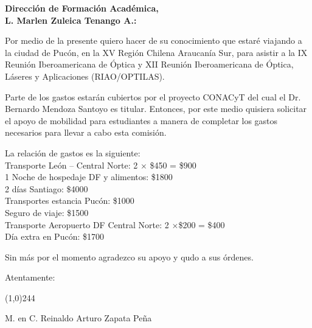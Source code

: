 \documentclass[11pt]{article}
\begin{document}
\thispagestyle{empty}

\noindent
\textbf{\large Direcci\'on de Formaci\'on Acad\'emica, \\
L. Marlen Zuleica Tenango A.:}

\vspace{2cm}

Por medio de la presente quiero hacer de su conocimiento que estar\'e viajando
a la ciudad de Puc\'on, en la XV Regi\'on Chilena Araucan\'ia Sur, para asistir
a la IX Reuni\'on Iberoamericana de \'Optica y XII Reuni\'on Iberoamericana de
\'Optica, L\'aseres y Aplicaciones (RIAO/OPTILAS).


\vspace{1cm}
Parte de los gastos estar\'an cubiertos por el proyecto CONACyT del cual el Dr.
Bernardo Mendoza Santoyo es titular. Entonces, por este medio quisiera solicitar
el apoyo de mobilidad para estudiantes a manera de completar los gastos
necesarios para llevar a cabo esta comisi\'on.

\vspace{1cm}
La relaci\'on de gastos es la siguiente: \\
Transporte Le\'on -- Central Norte: 2 $\times$ \$450 = \$900 \\
1 Noche de hospedaje DF y alimentos: \$1800 \\
2 d\'ias Santiago: \$4000 \\
Transportes estancia Puc\'on: \$1000 \\
Seguro de viaje: \$1500 \\
Transporte Aeropuerto DF Central Norte: 2 $\times$\$200 = \$400 \\
D\'ia extra en Puc\'on: \$1700 \\



\vspace{1cm}

Sin m\'as por el momento agradezco su apoyo y qudo a sus \'ordenes.

\vspace{1cm}

Atentamente:

\vspace{1cm}

\begin{center}
    \line(1,0){244}
	
    M. en C. Reinaldo Arturo Zapata Pe\~na
\end{center}
\end{document}
